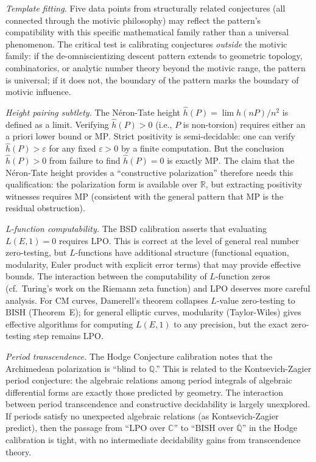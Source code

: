 \documentclass[11pt]{article}
\theoremstyle{definition}
\theoremstyle{remark}
\newcommand{\Q}{\mathbb{Q}}
\newcommand{\R}{\mathbb{R}}
\newcommand{\C}{\mathbb{C}}
\newcommand{\Qbar}{\overline{\Q}}
\newcommand{\LPO}{\mathrm{LPO}}
\newcommand{\MP}{\mathrm{MP}}
\newcommand{\BISH}{\mathrm{BISH}}
\begin{document}
\emph{Template fitting.} Five data points from structurally related conjectures (all connected through the motivic philosophy) may reflect the pattern's compatibility with this specific mathematical family rather than a universal phenomenon. The critical test is calibrating conjectures \emph{outside} the motivic family: if the de-omniscientizing descent pattern extends to geometric topology, combinatorics, or analytic number theory beyond the motivic range, the pattern is universal; if it does not, the boundary of the pattern marks the boundary of motivic influence.

\emph{Height pairing subtlety.} The N\'eron-Tate height $\hat{h}(P) = \lim h(nP)/n^2$ is defined as a limit. Verifying $\hat{h}(P) > 0$ (i.e., $P$ is non-torsion) requires either an a priori lower bound or $\MP$. Strict positivity is semi-decidable: one can verify $\hat{h}(P) > \varepsilon$ for any fixed $\varepsilon > 0$ by a finite computation. But the conclusion $\hat{h}(P) > 0$ from failure to find $\hat{h}(P) = 0$ is exactly $\MP$. The claim that the N\'eron-Tate height provides a ``constructive polarization'' therefore needs this qualification: the polarization form is available over $\R$, but extracting positivity witnesses requires $\MP$ (consistent with the general pattern that $\MP$ is the residual obstruction).

\emph{L-function computability.} The BSD calibration asserts that evaluating $L(E,1) = 0$ requires $\LPO$. This is correct at the level of general real number zero-testing, but $L$-functions have additional structure (functional equation, modularity, Euler product with explicit error terms) that may provide effective bounds. The interaction between the computability of $L$-function zeros (cf.\ Turing's work on the Riemann zeta function) and $\LPO$ deserves more careful analysis. For CM curves, Damerell's theorem collapses $L$-value zero-testing to $\BISH$ (Theorem~E); for general elliptic curves, modularity (Taylor-Wiles) gives effective algorithms for computing $L(E,1)$ to any precision, but the exact zero-testing step remains $\LPO$.

\emph{Period transcendence.} The Hodge Conjecture calibration notes that the Archimedean polarization is ``blind to $\Q$.'' This is related to the Kontsevich-Zagier period conjecture: the algebraic relations among period integrals of algebraic differential forms are exactly those predicted by geometry. The interaction between period transcendence and constructive decidability is largely unexplored. If periods satisfy no unexpected algebraic relations (as Kontsevich-Zagier predict), then the passage from ``$\LPO$ over $\C$'' to ``$\BISH$ over $\Qbar$'' in the Hodge calibration is tight, with no intermediate decidability gains from transcendence theory.
\end{document}
